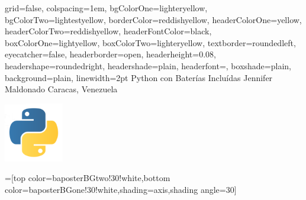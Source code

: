 \documentclass[landscape,a0paper,final,showframe]{baposter}
\begin{document}
\begin{poster}{
  grid=false,
  colspacing=1em,
  bgColorOne=lighteryellow,
  bgColorTwo=lightestyellow,
  borderColor=reddishyellow,
  headerColorOne=yellow,
  headerColorTwo=reddishyellow,
  headerFontColor=black,
  boxColorOne=lightyellow,
  boxColorTwo=lighteryellow,
  textborder=roundedleft,
  eyecatcher=false,
  headerborder=open,
  headerheight=0.08\textheight,
  headershape=roundedright,
  headershade=plain,
  headerfont=\Large\textsf, %
  boxshade=plain,
  background=plain,
  linewidth=2pt
  }
  {} %
  {\sf %
  Python con Baterías Incluídas}
  {\sf %
  Jennifer Maldonado\hspace{3em}
  Caracas, Venezuela
  }
  {{\begin{minipage}{16em}
    \hfill
    \includegraphics[height=7em]{python_logo}
  \end{minipage}}
  }

  =[top color=baposterBGtwo!30!white,bottom color=baposterBGone!30!white,shading=axis,shading angle=30]

     \newlength{\leftimgwidth}
     \setlength{\leftimgwidth}{0.78em+8.0em}

    \newcommand{\colouredcircle}[1]{%
      \tikz{\useasboundingbox (-0.2em,-0.32em) rectangle(0.2em,0.32em); \draw[draw=black,fill=baposterBGone!80!black!#1!white,line width=0.03em] (0,0) circle(0.18em);}}


\end{poster}
\end{document}
